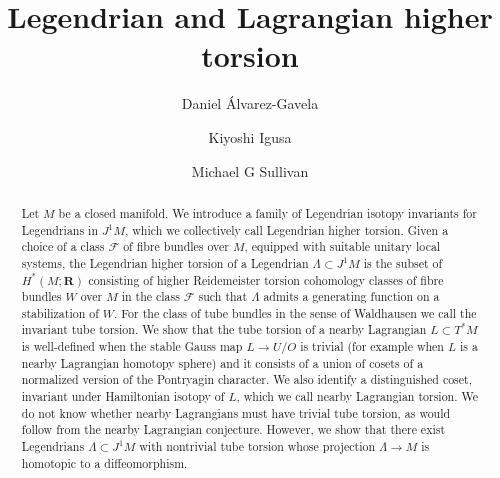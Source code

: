 \documentclass{amsart}
\title{Legendrian and Lagrangian higher torsion}
\author{Daniel  \'Alvarez-Gavela}
\author{Kiyoshi Igusa}
\author{Michael G Sullivan}
\newcommand\cF{\mathcal{F}}
\newcommand\cH{\mathcal{H}}
\def\bR{\mathbf{R}}
\theoremstyle{definition}
\theoremstyle{remark}
\newtheorem{inductive lemma}[theorem]{Inductive Lemma}
\begin{document}
\maketitle

\begin{abstract}
Let $M$ be a closed manifold. We introduce a family of Legendrian isotopy invariants for Legendrians in $J^1M$, which we collectively call Legendrian higher torsion. Given a choice of a class $\cF$ of fibre bundles over $M$, equipped with suitable unitary local systems, the Legendrian higher torsion of a Legendrian $\Lambda \subset J^1M$ is the subset of $H^*(M;\bR)$ consisting of higher Reidemeister torsion cohomology classes of fibre bundles $W$ over $M$ in the class $\cF$ such that $\Lambda$ admits a generating function on a stabilization of $W$.  For the class of tube bundles in the sense of Waldhausen we call the invariant tube torsion. We show that the tube torsion of a nearby Lagrangian $L \subset T^*M$ is well-defined when the stable Gauss map $L \to U/O$ is trivial (for example when $L$ is a nearby Lagrangian homotopy sphere) and it consists of a union of cosets of a normalized version of the Pontryagin character. We also identify a distinguished coset, invariant under Hamiltonian isotopy of $L$, which we call nearby Lagrangian torsion. We do not know whether nearby Lagrangians must have trivial tube torsion, as would follow from the nearby Lagrangian conjecture. %
However, we show that there exist Legendrians $\Lambda \subset J^1M$ with nontrivial tube torsion whose projection $\Lambda \to M$ is homotopic to a diffeomorphism.


 \end{abstract}
\end{document}
